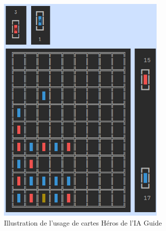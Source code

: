 \begin{figure}[h]
    \centering
    \includegraphics[width=\textwidth,angle=0]{./images/Guide.png}
    \caption{Illustration de l'usage de cartes Héros de l'IA Guide}
    \label{fig:guide1}
\end{figure}




